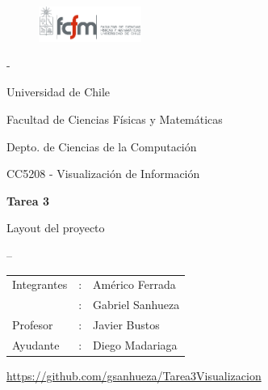 \documentclass[letterpaper,10pt]{article}
\begin{document}
	\begin{titlepage}

		\begin{figure}
			\includegraphics[width=0.3\textwidth]{logoFCFM.png}
		\end{figure}

		\noindent \phantom - %

		Universidad de Chile

		Facultad de Ciencias Físicas y Matemáticas

		Depto. de Ciencias de la Computación

		CC5208 - Visualización de Información

		\vfill

		\begin{center}
			\begin{Huge}
				{\textbf{Tarea 3}}
			\end{Huge}

			\begin{large}
				Layout del proyecto
			\end{large}

		\end{center}
--
		\vfill

		\begin{flushright}
			\begin{tabular}{lll}
				Integrantes	&:	& Américo Ferrada\\
						&:	& Gabriel Sanhueza\\
				Profesor	&:	& Javier Bustos\\
				Ayudante	&:	& Diego Madariaga\\
			\end{tabular}
		\end{flushright}

		\begin{flushright}
			\url{https://github.com/gsanhueza/Tarea3Visualizacion}\\
		\end{flushright}


	\end{titlepage}

	\newpage
\end{document}
